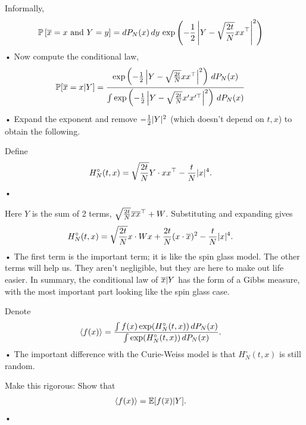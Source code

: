 Informally, 
\begin{align*}
\mathbb{P}\left[ {\overline{x}=x \text{ and }Y=y} \right]
&= dP_N(x)\,dy\, \exp\left( {-\frac{1}{2} \left| {Y-\sqrt{\frac{2t}{N}} x x^\top } \right|^2} \right)
\end{align*}•
Now compute the conditional law,
\begin{align*}
\mathbb{P}[\overline{x}= x|Y] &= \frac{\exp\left( {-\frac{1}{2} \left| {Y-\sqrt{\frac{2t}{N}}x x^\top } \right|^2} \right)\,dP_N(x)}{\int \exp\left( {-\frac{1}{2} \left| {Y-\sqrt{\frac{2t}{N}}x' x^{\prime\top} } \right|^2} \right)\,dP_N(x)}
\end{align*}•
Expand the exponent and remove $-\frac{1}{2}|Y|^2$ (which doesn't depend on $t,x$) to obtain the following.
\begin{df}
Define
\begin{align*}
H_N^\circ (t,x) &= \sqrt{\frac{2t}{N}} Y \cdot xx^\top - \frac{t}{N} |x|^4.
\end{align*}•
\end{df}
Here $Y$ is the sum of 2 terms, $\sqrt{\frac{2t}{N}} \overline{x} \overline{x}^\top +W$. Substituting and expanding gives
\begin{align*}
H_N^\circ (t,x) &= \sqrt{\frac{2t}{N}} x\cdot Wx + \frac{2t}{N}(x\cdot \overline{x})^2 - \frac{t}{N} |x|^4.
\end{align*}•
The first term is the important term; it is like the spin glass model. 
The other terms will help us. They aren't negligible, but they are here to make out life easier. 
In summary, the conditional law of $\overline{x}|Y$ has the form of a Gibbs measure, with the most important part looking like the spin glass case.

Denote 
\begin{align*}
\left\langle {f(x)}\right\rangle &= \frac{\int f(x) \exp(H_N^\circ (t,x))\,dP_N(x)}{\int \exp(H_N^\circ (t,x))\,dP_N(x)}.
\end{align*}•
The important difference with the Curie-Weiss model is that $H_N^\circ (t,x)$ is still random. 

\begin{exr}
Make this rigorous: Show that
\begin{align*}
\left\langle {f(x)}\right\rangle &= \mathbb{E}[f(\overline{x})|Y].
\end{align*}•
\end{exr}

